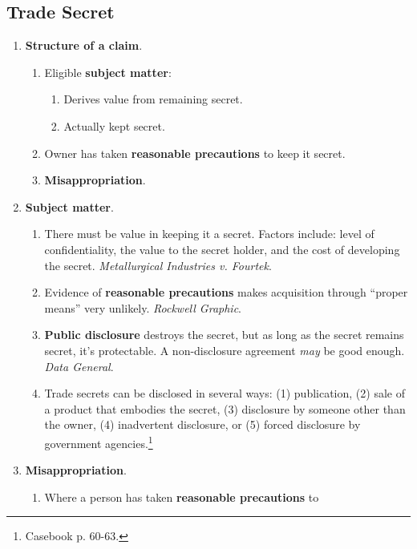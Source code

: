 \subsection{Trade Secret}

\begin{enumerate}
    \item \textbf{Structure of a claim}.
    \begin{enumerate}
        \item Eligible \textbf{subject matter}:
        \begin{enumerate}
            \item Derives value from remaining secret.
            \item Actually kept secret.
        \end{enumerate}
        \item Owner has taken \textbf{reasonable precautions} to keep it 
        secret.
        \item \textbf{Misappropriation}.
    \end{enumerate}
    \item \textbf{Subject matter}.
    \begin{enumerate}
        \item There must be value in keeping it a secret. Factors include: 
        level of confidentiality, the value to the secret holder, and the cost 
        of developing the secret. \emph{Metallurgical Industries v. Fourtek}.
        \item Evidence of \textbf{reasonable precautions} makes acquisition 
        through ``proper means'' very unlikely. \emph{Rockwell Graphic}.
        \item \textbf{Public disclosure} destroys the secret, but as long as 
        the secret remains secret, it's protectable. A non-disclosure 
        agreement \emph{may} be good enough. \emph{Data General}.
        \item Trade secrets can be disclosed in several ways: (1) publication, 
        (2) sale of a product that embodies the secret, (3) disclosure by 
        someone other than the owner, (4) inadvertent disclosure, or (5) 
        forced disclosure by government agencies.\footnote{Casebook p. 60-63.}
    \end{enumerate}
    \item \textbf{Misappropriation}.
    \begin{enumerate}
        \item Where a person has taken \textbf{reasonable precautions} to 

\end{enumerate}
\end{enumerate}
